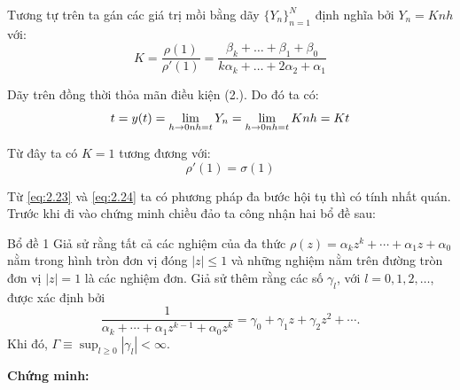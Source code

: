 Tương tự trên ta gán các giá trị mồi bằng dãy $\{Y_n\}^N_{n=1}$ định nghĩa bởi $Y_n =Knh$ với:
\[
K = \frac{\rho(1)}{\rho'(1)} = \frac{\beta_{k}+\dots+\beta_{1}+\beta_{0}}{k\alpha_{k}+\dots+2\alpha_{2}+\alpha_{1}}
\]

Dãy trên đồng thời thỏa mãn điều kiện (2.). Do đó ta có:
\[
t = y(t) = \lim_{h \to 0 \\ nh = t }Y_n = \lim_{h \to 0 \\ nh = t}Knh = Kt
\]

Từ đây ta có $K=1$ tương đương với:
\begin{equation}
    \rho'(1) = \sigma(1) \tag{2.24} \label{eq:2.24}
\end{equation}

Từ \eqref{eq:2.23} và \eqref{eq:2.24} ta có phương pháp đa bước hội tụ thì có tính nhất quán.\\

\noindent Trước khi đi vào chứng minh chiều đảo ta công nhận hai bổ đề sau:

\begin{baitapbox}{Bổ đề 1}
    Giả sử rằng tất cả các nghiệm của đa thức $\rho(z) = \alpha_k z^k + \cdots + \alpha_1 z + \alpha_0$ nằm trong hình tròn đơn vị đóng $|z| \le 1$ và những nghiệm nằm trên đường tròn đơn vị $|z| = 1$ là các nghiệm đơn. Giả sử thêm rằng các số $\gamma_l$, với $l = 0, 1, 2, \dots$, được xác định bởi
\begin{equation*}
    \frac{1}{\alpha_k + \cdots + \alpha_1 z^{k-1} + \alpha_0 z^k} = \gamma_0 + \gamma_1 z + \gamma_2 z^2 + \cdots .
\end{equation*}
Khi đó, $\Gamma \equiv \sup_{l \ge 0} |\gamma_l| < \infty$.
\end{baitapbox}
\noindent\textbf{Chứng minh:}\\

